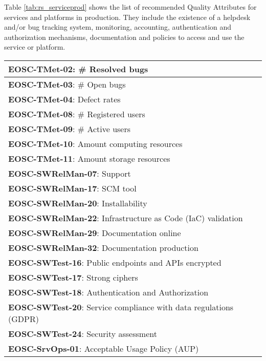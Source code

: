 Table \ref{tab:rs_serviceprod} shows the list of recommended Quality Attributes for services and platforms in production. They include the existence of a helpdesk and/or bug tracking system, monitoring, accounting, authentication and authorization mechanisms, documentation and policies to access and use the service or platform.

\begin{center}
\begin{table}
    \small
    \begin{tabular}{|p{\linewidth}|}

        \textbf{EOSC-TMet-02}: \# Resolved bugs \\ \hline
        \textbf{EOSC-TMet-03}: \# Open bugs \\ \hline
        \textbf{EOSC-TMet-04}: Defect rates \\ \hline
        \textbf{EOSC-TMet-08}: \# Registered users \\ \hline
        \textbf{EOSC-TMet-09}: \# Active users \\ \hline
        \textbf{EOSC-TMet-10}: Amount computing resources \\ \hline
        \textbf{EOSC-TMet-11}: Amount storage resources \\ \hline
        \textbf{EOSC-SWRelMan-07}: Support \\ \hline
        \textbf{EOSC-SWRelMan-17}: SCM tool \\ \hline
        \textbf{EOSC-SWRelMan-20}: Installability \\ \hline
        \textbf{EOSC-SWRelMan-22}: Infrastructure as Code (IaC) validation \\ \hline
        \textbf{EOSC-SWRelMan-29}: Documentation online \\ \hline
        \textbf{EOSC-SWRelMan-32}: Documentation production \\ \hline
        \textbf{EOSC-SWTest-16}: Public endpoints and APIs encrypted \\ \hline
        \textbf{EOSC-SWTest-17}: Strong ciphers \\ \hline
        \textbf{EOSC-SWTest-18}: Authentication and Authorization \\ \hline
        \textbf{EOSC-SWTest-20}: Service compliance with data regulations (GDPR) \\ \hline
        \textbf{EOSC-SWTest-24}: Security assessment \\ \hline
        \textbf{EOSC-SrvOps-01}: Acceptable Usage Policy (AUP) \\ \hline

\end{tabular}
\end{table}
\end{center}
